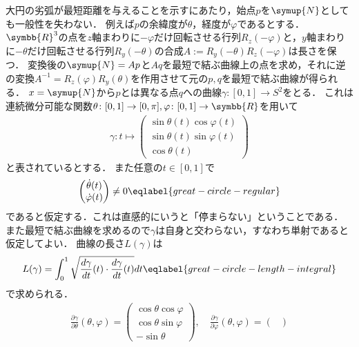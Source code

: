 \documentclass{ltjsbook}
\begin{document}
\begin{specialexample}
大円の劣弧が最短距離を与えることを示すにあたり，始点\(p\)を\(\symup{N}\)としても一般性を失わない．
例えば\(p\)の余緯度が\(\theta\)，経度が\(\varphi\)であるとする．
\(\symbb{R}^3\)の点を\(z\)軸まわりに\(-\varphi\)だけ回転させる行列\(R_z(-\varphi)\)と，\(y\)軸まわりに\(-\theta\)だけ回転させる行列\(R_y(-\theta)\)の合成\(A := R_y(-\theta) R_z(-\varphi)\)は長さを保つ．
変換後の\(\symup{N} = Ap\)と\(Aq\)を最短で結ぶ曲線上の点を求め，それに逆の変換\(A^{-1} = R_z(\varphi)R_y(\theta)\)を作用させて元の\(p, q\)を最短で結ぶ曲線が得られる．
\(x = \symup{N}\)から\(p\)とは異なる点\(q\)への曲線\(\gamma \colon [0, 1] \to S^2\)をとる．
これは連続微分可能な関数\(\theta \colon [0, 1] \to [0, \pi], \varphi \colon [0, 1] \to \symbb{R}\)を用いて
\begin{align*}
    \gamma \colon t \mapsto
        \begin{pmatrix}
            \sin \theta(t) \cos \varphi(t) \\
            \sin \theta(t) \sin \varphi(t) \\
            \cos \theta(t)
        \end{pmatrix}
\end{align*}
と表されているとする．
また任意の\(t \in [0, 1]\)で
\begin{align}
    \begin{pmatrix}
        \dot{\theta}(t) \\
        \dot{\varphi}(t)
    \end{pmatrix}
    \neq 0
    \eqlabel{great-circle-regular}
\end{align}
であると仮定する．これは直感的にいうと「停まらない」ということである．
また最短で結ぶ曲線を求めるので\(\gamma\)は自身と交わらない，すなわち単射であると仮定してよい．
曲線の長さ\(L(\gamma)\)は
\begin{align}
    L(\gamma) = \int_{0}^{1} \sqrt{\frac{d\gamma}{dt}(t) \cdot \frac{d\gamma}{dt}(t)} dt
    \eqlabel{great-circle-length-integral}
\end{align}
で求められる．
\begin{align*}
    \frac{\partial \gamma}{\partial \theta}(\theta, \varphi)
    =
    \begin{pmatrix}
        \cos \theta \cos \varphi \\
        \cos \theta \sin \varphi \\
        - \sin \theta
    \end{pmatrix},
    \quad
    \frac{\partial \gamma}{\partial \varphi}(\theta, \varphi)
    =
    \begin{pmatrix}

\end{pmatrix}
\end{align*}
\end{specialexample}
\end{document}
